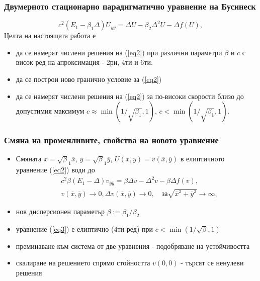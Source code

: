 \documentclass{beamer}
\newcommand{\rf}[1]{(\ref{#1})}
\begin{document}
\begin{frame}
\frametitle{ Двумерното стационарно парадигматично уравнение на Бусинеск }

\begin{equation}\label{eq2}
c^2 (E_1-\beta_1 \Delta) U_{yy} = \Delta U -\beta_2 \Delta^2 U - \Delta f(U),
\end{equation}
Целта на настоящата работа е
\begin{itemize}
  \item да се намерят числени решения на \rf{eq2} при различни параметри $\beta$ и $c$ с висок ред на апроксимация - 2ри, 4ти и 6ти.
  \item да се построи ново гранично условие за  \rf{eq2}
  \item да се намерят числени решения на \rf{eq2} за по-високи скорости близо до допустимия максимум $c \approx \min (1/ \sqrt{\beta_1},1)$, $c < \min (1/ \sqrt{\beta_1},1)$.
\end{itemize}
\end{frame}

\begin{frame}
\frametitle{Смяна на променливите, свойства на новото уравнение } 
 
\begin{itemize}
\item Смяната $x=\sqrt\beta_1 { \overline x}$, $y=\sqrt\beta_1 { \overline y}$, $U(x,y)= v({ \overline x},{ \overline y} )$ в елиптичното уравнение \rf{eq2} води до
 \begin{align}\label{eq3}
&c^2 \beta (E_1- \Delta) v_{{\overline y}{\overline y}} = \beta \Delta v - \Delta^2 v - \beta \Delta f(v), \\ 
&v(\overline x, \overline y) \rightarrow 0,  \Delta v(\overline x, \overline y) \rightarrow 0 ,  \quad \text{за}  \sqrt{\overline x^2 + \overline y^2} \rightarrow \infty, \nonumber
\end{align}
\end{itemize}
\begin{itemize}
  \item нов дисперсионен параметър $\beta := \beta_1/\beta_2$
  \item уравнение \rf{eq3} е елиптично (4ти ред) при $c < \min (1/ \sqrt{\beta},1)$
  \item преминаване към система от две уравнения - подобряване на устойчивостта
  \item скалиране на решението спрямо стойността $v(0,0)$ - търсят се ненулеви решения 
\end{itemize}

\end{frame}
\end{document}
